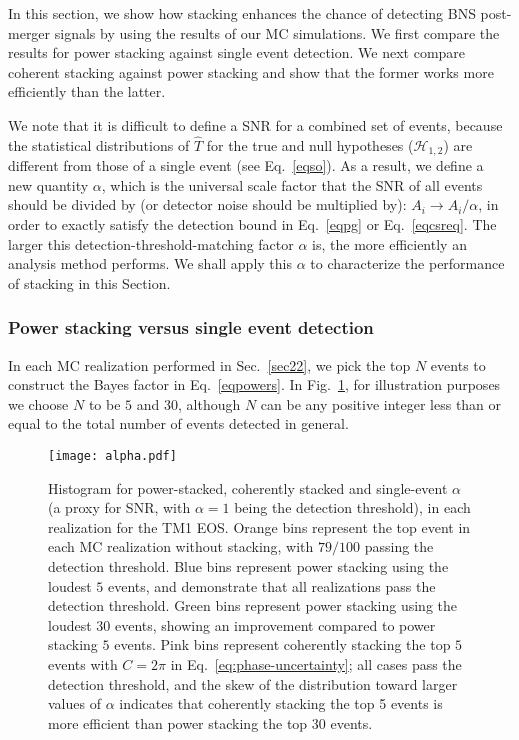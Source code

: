 \documentclass[prd,aps,floatfix,superscriptaddress,nofootinbib,twocolumn,10pt,English]{revtex4-1}
\begin{document}
In this section, we show how stacking enhances the chance of detecting
BNS post-merger signals by using the results of our MC simulations. We
first compare the results for power stacking against single event
detection. We next compare coherent stacking against power stacking
and show that the former works more efficiently than the latter.



We note that it is difficult to define a SNR for a combined set of
events, because the statistical distributions of $\hat{T}$ for the true and
null hypotheses ($\mathcal{H}_{1,2}$) are different from those of a
single event (see Eq.~\eqref{eqso}). As a result, we define
a new quantity $\alpha$, which is the universal scale factor that the
SNR of all events should be divided by (or detector noise should be
multiplied by): $A_{i} \rightarrow A_i/\alpha$, in order to exactly
satisfy the detection bound in Eq.~\eqref{eqpg} or
Eq.~\eqref{eqcsreq}. The larger this detection-threshold-matching
factor $\alpha$ is, the more efficiently an analysis method
performs. We shall apply this $\alpha$ to characterize the performance
of stacking in this Section.


\subsubsection{Power stacking versus single event detection}
\label{sec:stacking-vs-single}

In each MC realization performed in Sec.~\ref{sec22}, we pick the top
$N$ events to construct the Bayes factor in Eq.~\eqref{eqpowers}.  In
Fig.~\ref{fig:alpha}, for illustration purposes we choose $N$ to be $5$
and $30$, although $N$ can be any
positive integer less than or equal to the total number of events
detected in general.


\begin{figure}[tb]
\texttt{[image: alpha.pdf]}
\caption{
  Histogram for power-stacked, coherently stacked and single-event
  $\alpha$ (a proxy for SNR, with $\alpha=1$ being the detection threshold),
  in each realization for the
  TM1 EOS. Orange bins represent the top event in each MC realization without stacking, with
  $79/100$ passing the detection threshold. Blue bins
  represent power stacking using the loudest $5$ events, and
  demonstrate that all realizations pass the detection threshold.
  Green bins represent power stacking using the loudest
  $30$ events, showing an improvement compared
  to power stacking $5$ events.
  Pink bins represent coherently stacking the top $5$ events
  with $C=2\pi$ in Eq.~\eqref{eq:phase-uncertainty}; all cases
  pass the detection threshold, and the skew of the distribution 
  toward larger values of $\alpha$ 
  indicates that
  coherently stacking the top 5 events is more efficient than
  power stacking the top 30 events.}
\label{fig:alpha}
\end{figure}
\end{document}
